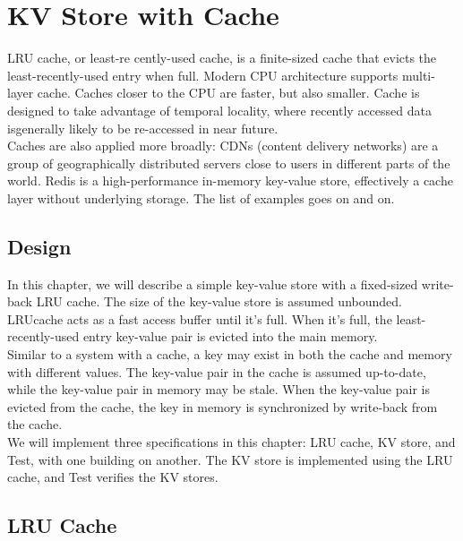 % 

\usetikzlibrary{arrows.meta} %

\chapter{KV Store with Cache}

LRU cache, or least-re cently-used cache, is a finite-sized cache that evicts 
the least-recently-used entry when full. Modern CPU architecture supports
multi-layer cache. Caches closer to the CPU are faster, but also smaller. Cache is 
designed to take advantage of temporal locality, where recently accessed data isgenerally likely to be re-accessed in near future.\\

Caches are also applied more broadly: CDNs (content delivery
networks) are a group of geographically distributed servers close to
users in different parts of the world. Redis is a high-performance in-memory
key-value store, effectively a cache layer without underlying storage. The list of
examples goes on and on.

\section{Design}

In this chapter, we will describe a simple key-value store with a fixed-sized 
write-back LRU cache. The size of the key-value store is assumed unbounded. LRUcache acts as a fast access buffer until it's full. When it's full, the
least-recently-used entry key-value pair is evicted into the main memory.\\

Similar to a system with a cache, a key may exist in both the cache and memory
with different values. The key-value pair in the cache is assumed up-to-date,
while the key-value pair in memory may be stale. When the key-value pair is
evicted from the cache, the key in memory is synchronized by write-back from
the cache.\\

We will implement three specifications in this chapter: LRU cache, KV store, and
Test, with one building on another. The KV store is implemented using the LRU
cache, and Test verifies the KV stores.

\section{LRU Cache}

